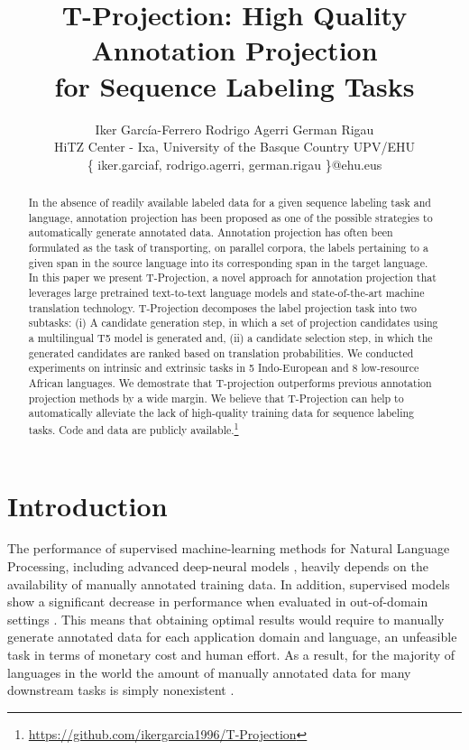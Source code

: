 \documentclass[11pt]{article}
\title{T-Projection: High Quality Annotation Projection \\ for Sequence Labeling Tasks}
\author{Iker García-Ferrero \quad Rodrigo Agerri \quad German Rigau \\
        HiTZ Center - Ixa, University of the Basque Country UPV/EHU \\
         \{
         iker.garciaf,
         rodrigo.agerri,
         german.rigau
\}@ehu.eus}
\begin{document}
\maketitle



\begin{abstract}
In the absence of readily available labeled data for a given sequence labeling
task and language, annotation projection has been proposed as one of the
possible strategies to automatically generate annotated data. Annotation
projection has often been formulated as the task of transporting, on parallel
corpora, the labels pertaining to a given span in the source language into its
corresponding span in the target language. In this paper we present
T-Projection, a novel approach for annotation projection that leverages large
pretrained text-to-text language models and state-of-the-art machine translation
technology. T-Projection decomposes the label projection task into two
subtasks: (i) A candidate generation step, in which a set of projection
candidates using a multilingual T5 model is generated and, (ii) a candidate
selection step, in which the generated candidates are ranked based on
translation probabilities. 
We conducted experiments on intrinsic and extrinsic tasks in 5 Indo-European and 8 low-resource African languages. We demostrate that T-projection outperforms previous annotation projection methods by a wide margin. 
We believe that
T-Projection can help to automatically alleviate the lack of high-quality
training data for sequence labeling tasks. Code and data are publicly available.\footnote{\url{https://github.com/ikergarcia1996/T-Projection}}

\end{abstract}




\section{Introduction}





The performance of supervised machine-learning methods for Natural Language Processing, including advanced 
deep-neural models \cite{DBLP:conf/naacl/DevlinCLT19,xlmr,DBLP:conf/naacl/XueCRKASBR21,DBLP:journals/corr/abs-2205-01068},
heavily depends on the availability of manually annotated training data. 
In addition, supervised models show a significant decrease in
performance when evaluated in out-of-domain settings
\cite{DBLP:conf/aaai/Liu0YDJCMF21}. This means that obtaining optimal results
would require to manually generate annotated data for each application
domain and language, an unfeasible task in terms of monetary cost and human
effort. As a result, for the majority of languages in the world the amount of manually
annotated data for many downstream tasks is simply nonexistent
\cite{joshi-etal-2020-state}.
\end{document}
